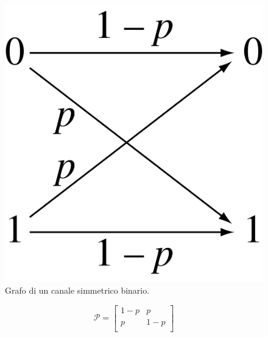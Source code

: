 \begin{minipage}{0.45\textwidth}
\begin{figure}[H]
    \centering
    \includegraphics[scale=0.08]{img/bsc.png}
    \caption{Grafo di un canale simmetrico binario.}
\end{figure}
\end{minipage}
\begin{minipage}{0.45\textwidth}
\begin{equation*}
    \mathcal{P} = \begin{bmatrix}
    1-p & p \\
    p & 1-p \\
    \end{bmatrix}
\end{equation*}
\end{minipage}

